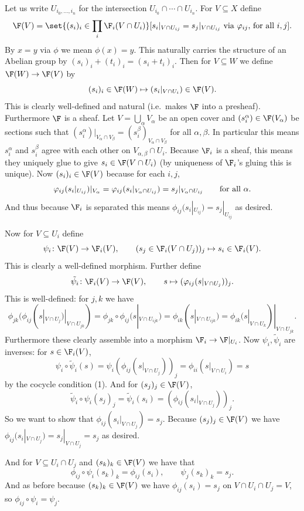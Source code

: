 Let us write $U_{i_0,\dots,i_n}$ for the intersection $U_{i_0}\cap\cdots\cap U_{i_n}$.
For $V\subseteq X$ define
$$ \F(V) = \set{(s_i)_i\in\prod_i\F_i(V\cap U_i)}[s_i|_{V\cap U_{ij}}=s_j|_{V\cap U_{ij}}\hbox{ via $\phi_{ij}$, for all $i,j$}] . $$
By $x=y$ via $\phi$ we mean $\phi(x)=y$.
This naturally carries the structure of an Abelian group by $(s_i)_i+(t_i)_i=(s_i+t_i)_i$.
Then for $V\subseteq W$ we define $\F(W)\to\F(V)$ by
$$ (s_i)_i \in \F(W) \mapsto (s_i|_{V\cap U_i}) \in \F(V) . $$
This is clearly well-defined and natural (i.e.\ makes $\F$ into a presheaf).
Furthermore $\F$ is a sheaf.
Let $V=\bigcup_\alpha V_\alpha$ be an open cover and $(s_i^\alpha)\in\F(V_\alpha)$ be sections such that $(s_i^\alpha)|_{V_\alpha\cap V_\beta}=(s_i^\beta)_{V_\alpha\cap V_\beta}$
for all $\alpha,\beta$.
In particular this means $s_i^\alpha$ and $s_i^\beta$ agree with each other on $V_{\alpha,\beta}\cap U_i$.
Because $\F_i$ is a sheaf, this means they uniquely glue to give $s_i\in\F(V\cap U_i)$ (by uniqueness of $\F_i$'s gluing this is unique).
Now $(s_i)_i\in\F(V)$ because for each $i,j$,
$$ \phi_{ij}(s_i|_{U_{ij}})|_{V_\alpha} = \phi_{ij}(s_i|_{V_\alpha\cap U_{ij}}) = s_j|_{V_\alpha\cap U_{ij}}\qquad\hbox{for all $\alpha$} . $$
And thus because $\F_i$ is separated this means $\phi_{ij}(s_i|_{U_{ij}})=s_j|_{U_{ij}}$ as desired.

Now for $V\subseteq U_i$ define
$$ \psi_i\colon\F(V) \to \F_i(V),\qquad (s_j\in\F_i(V\cap U_j))_j \mapsto s_i \in \F_i(V) . $$
This is clearly a well-defined morphism.
Further define
$$ \tilde\psi_i\colon\F_i(V)\to\F(V),\qquad s \mapsto (\phi_{ij}(s|_{V\cap U_j}))_j . $$
This is well-defined: for $j,k$ we have
$$ \phi_{jk}(\phi_{ij}(s|_{V\cap U_j})|_{V\cap U_{jk}}) = \phi_{jk}\circ\phi_{ij}(s|_{V\cap U_{ijk}}) = \phi_{ik}(s|_{V\cap U_{ijk}}) = \phi_{ik}(s|_{V\cap U_k})|_{V\cap U_{jk}} . $$
Furthermore these clearly assemble into a morphism $\F_i\to\F|_{U_i}$.
Now $\psi_i,\tilde\psi_i$ are inverses: for $s\in\F_i(V)$,
$$ \psi_i\circ\tilde\psi_i(s) = \psi_i(\phi_{ij}(s|_{V\cap U_j}))_j = \phi_{ii}(s|_{V\cap U_i}) = s $$
by the cocycle condition (1).
And for $(s_j)_j\in\F(V)$,
$$ \tilde\psi_i\circ\psi_i(s_j)_j = \tilde\psi_i(s_i) = (\phi_{ij}(s_i|_{V\cap U_j}))_j . $$
So we want to show that $\phi_{ij}(s_i|_{V\cap U_j})=s_j$.
Because $(s_j)_j\in\F(V)$ we have $\phi_{ij}(s_i|_{V\cap U_j})=s_j|_{V\cap U_j}=s_j$ as desired.

And for $V\subseteq U_i\cap U_j$ and $(s_k)_k\in\F(V)$ we have that
$$ \phi_{ij}\circ\psi_i(s_k)_k = \phi_{ij}(s_i),\qquad \psi_j(s_k)_k = s_j . $$
And as before because $(s_k)_k\in\F(V)$ we have $\phi_{ij}(s_i)=s_j$ on $V\cap U_i\cap U_j=V$, so $\phi_{ij}\circ\psi_i=\psi_j$.


